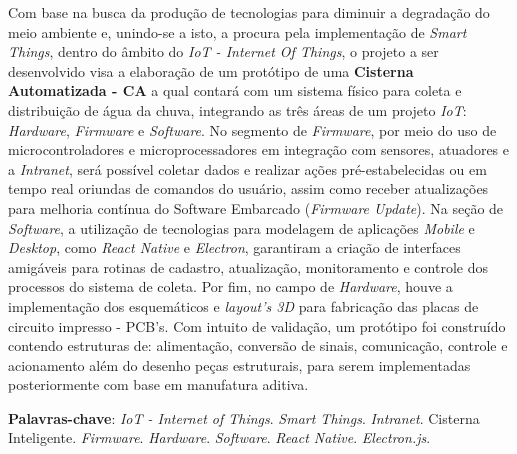 
\begin{resumo}[RESUMO]
\begin{SingleSpacing}

 Com base na busca da produção de tecnologias para diminuir a degradação do meio ambiente e, unindo-se a isto, a procura pela implementação de \textit{Smart Things}, dentro do âmbito do \textit{IoT - Internet Of Things},  o projeto a ser desenvolvido visa a elaboração de um protótipo de uma \textbf{Cisterna Automatizada - CA} a qual contará com um sistema físico para coleta e distribuição de água da chuva, integrando as três áreas de um projeto \textit{IoT}: \textit{Hardware}, \textit{Firmware} e \textit{Software}. No segmento de \textit{Firmware}, por meio do uso de microcontroladores e microprocessadores em integração com sensores, atuadores e a \textit{Intranet}, será possível coletar dados e realizar ações pré-estabelecidas ou em tempo real oriundas de comandos do usuário, assim como receber atualizações para melhoria contínua do Software Embarcado (\textit{Firmware Update}).  Na seção de \textit{Software}, a utilização de tecnologias para modelagem de aplicações \textit{Mobile} e \textit{Desktop}, como  \textit{React Native} e \textit{Electron},  garantiram a criação de interfaces amigáveis para rotinas de cadastro, atualização, monitoramento e controle dos processos do sistema de coleta. Por fim, no campo de \textit{Hardware}, houve a implementação dos esquemáticos e \textit{layout's 3D}  para fabricação das placas de circuito impresso - PCB's. Com intuito de validação, um protótipo foi construído contendo estruturas de: alimentação, conversão de sinais, comunicação, controle e acionamento além do desenho peças estruturais, para serem implementadas posteriormente com base em manufatura aditiva.
 
\vspace{\onelineskip}

\textbf{Palavras-chave}: \textit{IoT - Internet of Things}. \textit{Smart Things}. \textit{Intranet}.  Cisterna Inteligente. \textit{Firmware}. \textit{Hardware}. \textit{Software}. \textit{React Native}. \textit{Electron.js}.

\end{SingleSpacing}
\end{resumo}


